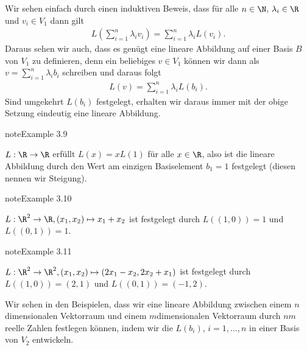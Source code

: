 \documentclass[letterpaper,10pt,english]{jupyterBook}
\begin{document}
Wir sehen einfach durch einen induktiven Beweis, dass für alle \(n \in \N\), \(\lambda_i \in \R\) und \(v_i \in V_1\) dann gilt
\begin{equation*}
\begin{split} L(\sum_{i=1}^n \lambda_i v_i) = \sum_{i=1}^n \lambda_i L(v_i) .\end{split}
\end{equation*}
Daraus sehen wir auch, dass es genügt eine lineare Abbildung auf einer Basis \(B\) von \(V_1\) zu definieren, denn ein beliebiges \(v \in V_1\) können wir dann als \(v= \sum_{i=1}^n \lambda_i b_i\) schreiben und daraus folgt
\begin{equation*}
\begin{split} L(v) = \sum_{i=1}^n \lambda_i L(b_i).\end{split}
\end{equation*}
Sind umgekehrt \(L(b_i)\) festgelegt, erhalten wir daraus immer mit der obige Setzung eindeutig eine lineare Abbildung.
\label{vektorraeume/LineareAbb:example-1}
\begin{sphinxadmonition}{note}{Example 3.9}



\(L: \R \rightarrow \R\) erfüllt \(L(x) = x L(1)\) für alle \(x \in \R\), also ist die lineare Abbildung durch den Wert am einzigen Basiselement \(b_1=1\) festgelegt (diesen nennen wir Steigung).
\end{sphinxadmonition}
\label{vektorraeume/LineareAbb:example-2}
\begin{sphinxadmonition}{note}{Example 3.10}



\(L: \R^2 \rightarrow \R, (x_1,x_2) \mapsto x_1 +x_2\) ist festgelegt durch \(L((1,0)) = 1\) und \(L((0,1))=1\).
\end{sphinxadmonition}
\label{vektorraeume/LineareAbb:example-3}
\begin{sphinxadmonition}{note}{Example 3.11}



\(L: \R^2 \rightarrow \R^2, (x_1,x_2) \mapsto (2x_1-x_2,2x_2+x_1)\) ist festgelegt durch \(L((1,0)) = (2,1)\) und \(L((0,1))=(-1,2)\).
\end{sphinxadmonition}

Wir sehen in den Beispielen, dass wir eine lineare Abbildung zwischen einem \(n\)\sphinxhyphen{}dimensionalen Vektorraum und einem \(m\)\sphinxhyphen{}dimensionalen Vektorraum durch \(nm\) reelle Zahlen festlegen können, indem wir die \(L(b_i)\), \(i=1,\ldots,n\) in einer Basis von \(V_2\) entwickeln.
\end{document}
